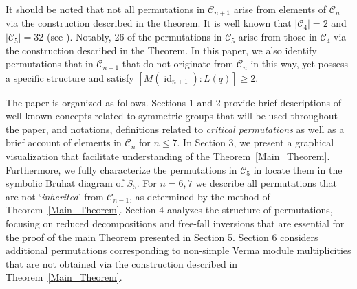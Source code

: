 \documentclass[a4 paper,12pt]{article}
\DeclareMathOperator{\id}{id}
\begin{document}
It should be noted that not all permutations in $\mathcal{C}_{n+1}$ arise from elements of $\mathcal{C}_{n}$   via the construction described in the theorem. It is well known that $ |\mathcal{C}_4| = 2 $ and $ |\mathcal{C}_5| = 32 $ (see \cite[5.24]{Jantzen}). Notably, 26 of the permutations in $ \mathcal{C}_5 $ arise from those in $ \mathcal{C}_4 $ via the construction described in the Theorem. 
In this paper, we also identify    permutations that  in $\mathcal{C}_{n+1}$  that do not originate from $\mathcal{C}_{n}$ in this way, yet possess a specific structure and satisfy $[M(\id_{n+1}):L(q)] \geq 2 $.


The paper is organized as follows. Sections 1 and 2 provide brief descriptions of well-known concepts related to symmetric groups that will be used throughout the paper, and 
 notations, definitions related to \textit{critical permutations} as well as a brief account of  elements  in $\mathcal{C}_{n}$ for $n\leq 7$. In Section 3, we present a graphical visualization that facilitate understanding of the Theorem~\ref{Main_Theorem}. Furthermore, we fully characterize the permutations in $\mathcal{C}_{5}$ in 
locate them in the symbolic Bruhat diagram of $S_5$. For $n=6,7$ we describe all permutations that are not `\textit{inherited}' from $\mathcal{C}_{n-1}$, as determined by the method of Theorem~\ref{Main_Theorem}. Section 4 analyzes the structure of permutations, focusing on reduced decompositions and free-fall inversions that are  essential for the proof of the main Theorem presented in Section 5. Section 6 considers additional permutations corresponding to non-simple Verma module multiplicities that are not obtained via the  construction described in Theorem~\ref{Main_Theorem}.
\end{document}
